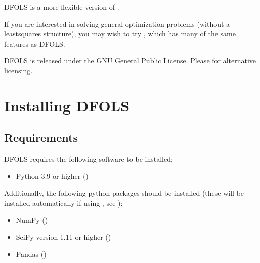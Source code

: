 \documentclass[letterpaper,10pt,english]{sphinxmanual}
\begin{document}
\sphinxAtStartPar
DFO\sphinxhyphen{}LS is a more flexible version of .

\sphinxAtStartPar
If you are interested in solving general optimization problems (without a least\sphinxhyphen{}squares structure), you may wish to try , which has many of the same features as DFO\sphinxhyphen{}LS.

\sphinxAtStartPar
DFO\sphinxhyphen{}LS is released under the GNU General Public License. Please  for alternative licensing.

\sphinxstepscope


\chapter{Installing DFO\sphinxhyphen{}LS}
\label{\detokenize{install:installing-dfo-ls}}\label{\detokenize{install::doc}}

\section{Requirements}
\label{\detokenize{install:requirements}}
\sphinxAtStartPar
DFO\sphinxhyphen{}LS requires the following software to be installed:
\begin{itemize}
\item {} 
\sphinxAtStartPar
Python 3.9 or higher ()

\end{itemize}

\sphinxAtStartPar
Additionally, the following python packages should be installed (these will be installed automatically if using , see {\hyperref[\detokenize{install:installation-using-pip}]{}}):
\begin{itemize}
\item {} 
\sphinxAtStartPar
NumPy ()

\item {} 
\sphinxAtStartPar
SciPy version 1.11 or higher ()

\item {} 
\sphinxAtStartPar
Pandas ()

\end{itemize}
\end{document}
